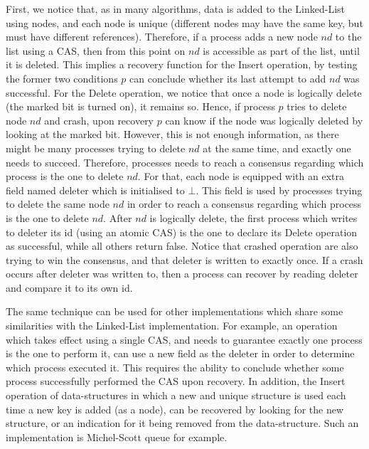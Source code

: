 First, we notice that, as in many algorithms, data is added to the Linked-List using nodes, and each node is unique (different nodes may have the same key, but must have different references). Therefore, if a process adds a new node $nd$ to the list using a CAS, then from this point on $nd$ is accessible as part of the list, until it is deleted. This implies a recovery function for the Insert operation, by testing the former two conditions $p$ can conclude whether its last attempt to add $nd$ was successful. For the Delete operation, we notice that once a node is logically delete (the marked bit is turned on), it remains so. Hence, if process $p$ tries to delete node $nd$ and crash, upon recovery $p$ can know if the node was logically deleted by looking at the marked bit. However, this is not enough information, as there might be many processes trying to delete $nd$ at the same time, and exactly one needs to succeed. Therefore, processes needs to reach a consensus regarding which process is the one to delete $nd$. For that, each node is equipped with an extra field named deleter which is initialised to $\bot$. This field is used by processes trying to delete the same node $nd$ in order to reach a consensus regarding which process is the one to delete $nd$. After $nd$ is logically delete, the first process which writes to deleter its id (using an atomic CAS) is the one to declare its Delete operation as successful, while all others return false. Notice that crashed operation are also trying to win the consensus, and that deleter is written to exactly once. If a crash occurs after deleter was written to, then a process can recover by reading deleter and compare it to its own id.

The same technique can be used for other implementations which share some similarities with the Linked-List implementation. For example, an operation which takes effect using a single CAS, and needs to guarantee exactly one process is the one to perform it, can use a new field as the deleter in order to determine which process executed it. This requires the ability to conclude whether some process successfully performed the CAS upon recovery. In addition, the Insert operation of data-structures in which a new and unique structure is used each time a new key is added (as a node), can be recovered by looking for the new structure, or an indication for it being removed from the data-structure. Such an implementation is Michel-Scott queue for example.





